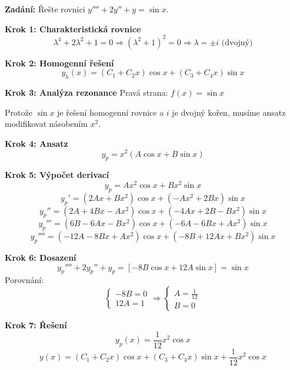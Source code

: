 \begin{example}
\label{ex:dvojny-imaginary-koren}

\noindent\textbf{Zadání:} Řešte rovnici $y'''' + 2y'' + y = \sin x$.

\vspace{1.5\baselineskip}

\noindent\textbf{Krok 1: Charakteristická rovnice}
\[
\lambda^4 + 2\lambda^2 + 1 = 0 \Rightarrow (\lambda^2 + 1)^2 = 0 \Rightarrow \lambda = \pm i \text{ (dvojný)}
\]

\vspace{1\baselineskip}

\noindent\textbf{Krok 2: Homogenní řešení}
\[
y_h(x) = (C_1 + C_2 x)\cos x + (C_3 + C_4 x)\sin x
\]

\vspace{1\baselineskip}

\noindent\textbf{Krok 3: Analýza rezonance}
Pravá strana: $f(x) = \sin x$

Protože $\sin x$ je řešení homogenní rovnice a $i$ je dvojný kořen, musíme ansatz modifikovat násobením $x^2$.

\vspace{1\baselineskip}

\noindent\textbf{Krok 4: Ansatz}
\[
y_p = x^2(A\cos x + B\sin x)
\]

\vspace{1\baselineskip}

\noindent\textbf{Krok 5: Výpočet derivací}
\[
y_p = Ax^2\cos x + Bx^2\sin x
\]
\[
y_p' = (2Ax + Bx^2)\cos x + (-Ax^2 + 2Bx)\sin x
\]
\[
y_p'' = (2A + 4Bx - Ax^2)\cos x + (-4Ax + 2B - Bx^2)\sin x
\]
\[
y_p''' = (6B - 6Ax - Bx^2)\cos x + (-6A - 6Bx + Ax^2)\sin x
\]
\[
y_p'''' = (-12A - 8Bx + Ax^2)\cos x + (-8B + 12Ax + Bx^2)\sin x
\]

\vspace{1\baselineskip}

\noindent\textbf{Krok 6: Dosazení}
\[
y_p'''' + 2y_p'' + y_p = [-8B\cos x + 12A\sin x] = \sin x
\]
Porovnání:
\[
\begin{cases}
-8B = 0 \\
12A = 1
\end{cases}
\Rightarrow
\begin{cases}
A = \frac{1}{12} \\
B = 0
\end{cases}
\]

\vspace{1\baselineskip}

\noindent\textbf{Krok 7: Řešení}
\[
y_p(x) = \frac{1}{12}x^2\cos x
\]
\[
y(x) = (C_1 + C_2 x)\cos x + (C_3 + C_4 x)\sin x + \frac{1}{12}x^2\cos x
\]

\end{example}

